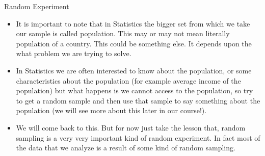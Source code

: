 \documentclass[8pt, usepdftitle = false]{beamer}
\begin{document}
\begin{frame}[allowframebreaks]{Random Experiment}
\begin{itemize}
\item It is important to note that in Statistics the bigger set from which we take our sample is called \alert{population}. This may or may not mean literally population of a country. This could be something else. It depends upon the what problem we are trying to solve.

\item In Statistics we are often interested to know about the population, or some characteristics about the population (for example average income of the population) but what happens is we cannot access to the population, so try to get a random sample and then use that sample to say something about the population (we will see more about this later in our course!).

\item We will come back to this. But for now just take the lesson that, \alert{random sampling} is a very very important kind of random experiment. In fact most of the data that we analyze is a result of some kind of \alert{random sampling}. 






\end{itemize}
\end{frame}
\end{document}
